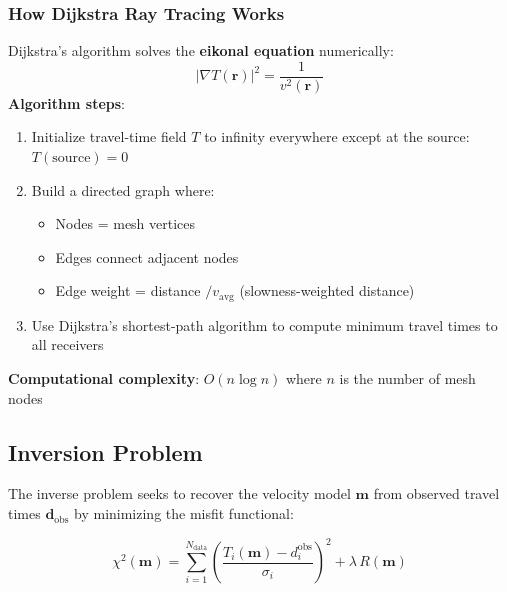 \subsubsection*{How Dijkstra Ray Tracing Works}
Dijkstra's algorithm solves the \textbf{eikonal equation} numerically:
\begin{equation}
|\nabla T(\mathbf{r})|^2 = \frac{1}{v^2(\mathbf{r})}
\end{equation}
\textbf{Algorithm steps}:
\begin{enumerate}
    \item Initialize travel-time field $T$ to infinity everywhere except at the source: $T(\text{source}) = 0$
    \item Build a directed graph where:
    \begin{itemize}
        \item Nodes = mesh vertices
        \item Edges connect adjacent nodes
        \item Edge weight = distance $/ v_{\text{avg}}$ (slowness-weighted distance)
    \end{itemize}
    \item Use Dijkstra's shortest-path algorithm to compute minimum travel times to all receivers
\end{enumerate}

\textbf{Computational complexity}: $O(n \log n)$ where $n$ is the number of mesh nodes
\subsection*{Inversion Problem}
The inverse problem seeks to recover the velocity model $\mathbf{m}$ from observed travel times $\mathbf{d}_{\text{obs}}$ by minimizing the misfit functional:

\begin{equation}
\chi^2(\mathbf{m}) = \sum_{i=1}^{N_{\text{data}}} \left( \frac{T_i(\mathbf{m}) - d_i^{\text{obs}}}{\sigma_i} \right)^2 + \lambda \, R(\mathbf{m})
\end{equation}

